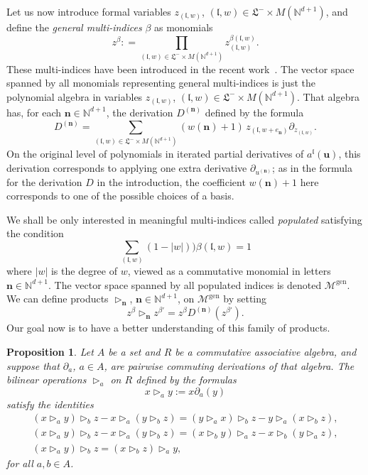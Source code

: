 \documentclass[10pt,a4paper]{article}
\newtheorem{prop}[theo]{Proposition}
\theoremstyle{definition}
\numberwithin{equation}{section}
\numberwithin{figure}{section}
\newcommand{\bn}{\mathbf{n}}
\newcommand{\bu}{\mathbf{u}}
\newcommand{\mcM}{\mathcal{M}}
\newcommand{\mfl}{\mathfrak{l}}
\newcommand{\mfL}{\mathfrak{L}}
\newcommand{\bbN}{\mathbb{N}}
\newcommand{\genn}{\mathrm{gen}}
\begin{document}
Let us now introduce formal variables $z_{(\mfl,w)}$, $(\mfl,w) \in \mfL^-\times M(\bbN^{d+1})$, and define the \emph{general multi-indices} $\beta$ as monomials
\begin{equation}\label{general_multi_indices}
z^{\beta} : = \prod_{(\mfl,w) \in \mfL^-\times M(\bbN^{d+1})} z_{(\mfl,w)}^{\beta(\mfl,w)}.
\end{equation}
These multi-indices have been introduced in the recent work~\cite{BL23}. The vector space spanned by all monomials representing general multi-indices is just the polynomial algebra in variables $z_{(\mfl,w)}$, $(\mfl,w) \in \mfL^-\times M(\bbN^{d+1})$. That algebra has, for each $\bn\in\bbN^{d+1}$, the derivation $D^{(\bn)}$ defined by the formula
\begin{equation}\label{derivations}
D^{(\bn)}=\sum_{(\mfl,w) \in \mfL^-\times M(\bbN^{d+1})} (w(\bn) +1) \, z_{(\mfl,w+e_{\bn})}\partial_{z_{(\mfl,w)}}.
\end{equation}
On the original level of polynomials in iterated partial derivatives of $a^\mfl (\bu)$, this derivation corresponds to applying one extra derivative $\partial_{u^{(\bn)}}$; as in the formula for the derivation $D$ in the introduction, the coefficient $w(\bn)+1$ here corresponds to one of the possible choices of a basis.

We shall be only interested in meaningful multi-indices called \emph{populated} satisfying the condition
\begin{equation}\label{populated_bis}
\sum_{(\mfl,w)} (1 - |w|))\beta(\mfl,w) = 1
\end{equation}
where $ |w|$ is the degree of $w$, viewed as a commutative monomial in letters $\bn\in\bbN^{d+1}$. The vector space spanned by all populated indices is denoted $\mcM^{\genn}$. We can define products $\triangleright_\bn$, $\bn\in\bbN^{d+1}$, on $\mcM^{\genn}$ by setting
\begin{equation}\label{def_products}
z^{\beta} \triangleright_\bn z^{\beta'} = z^{\beta} D^{(\bn)} (z^{\beta'}).
\end{equation}
Our goal now is to have a better understanding of this family of products.

\begin{prop}\label{multi_Nov_example}
Let $A$ be a set and $R$ be a commutative associative algebra, and suppose that $\partial_a$, $a\in A$, are pairwise commuting derivations of that algebra. The bilinear operations $\triangleright_a$ on $R$ defined by the formulas
\[
x\triangleright_a y:=x\partial_a(y)
\]
satisfy the identities
\begin{gather*}
(x \triangleright_a y) \triangleright_b z - x \triangleright_a (y \triangleright_b z) = (y \triangleright_a x) \triangleright_b z - y \triangleright_a (x \triangleright_b z),
\\ (x \triangleright_a y) \triangleright_b z - x \triangleright_a (y \triangleright_b z) = (x\triangleright_b y) \triangleright_a z - x \triangleright_b (y \triangleright_a z),
\\ (x \triangleright_a y) \triangleright_b z = (x \triangleright_b z)\triangleright_a y,
\end{gather*}
for all $ a,b\in A$.
\end{prop}
\end{document}
